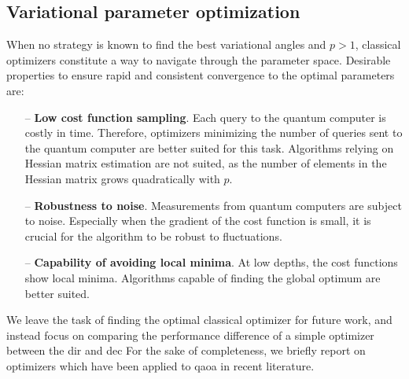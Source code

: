 \subsection{Variational parameter optimization} \label{sec:qaoa_optimization}
When no strategy is known to find the best variational angles and  $p > 1$,  classical optimizers constitute a way to navigate through the parameter space. Desirable properties to ensure rapid and consistent convergence to the optimal parameters are:
\begin{itemize}
    \item [--] \textbf{Low cost function sampling}. Each query to the quantum computer is costly in time. Therefore, optimizers minimizing the number of queries sent to the quantum computer are better suited for this task. Algorithms relying on Hessian matrix estimation are not suited, as the number of elements in the Hessian matrix grows quadratically with $p$.
    \item[--] \textbf{Robustness to noise}. Measurements from quantum computers are subject to noise. Especially when the gradient of the cost function is small, it is crucial for the algorithm to be robust to fluctuations.
    \item[--] \textbf{Capability of avoiding local minima}. At low depths, the cost functions show local minima. Algorithms capable of finding the global optimum are better suited.
\end{itemize}

We leave the task of finding the optimal classical optimizer for future work, and instead focus on comparing the performance difference of a simple optimizer between the \gls{dir} and \gls{dec}
For the sake of completeness, we briefly report on optimizers which have been applied to \gls{qaoa} in recent literature.

